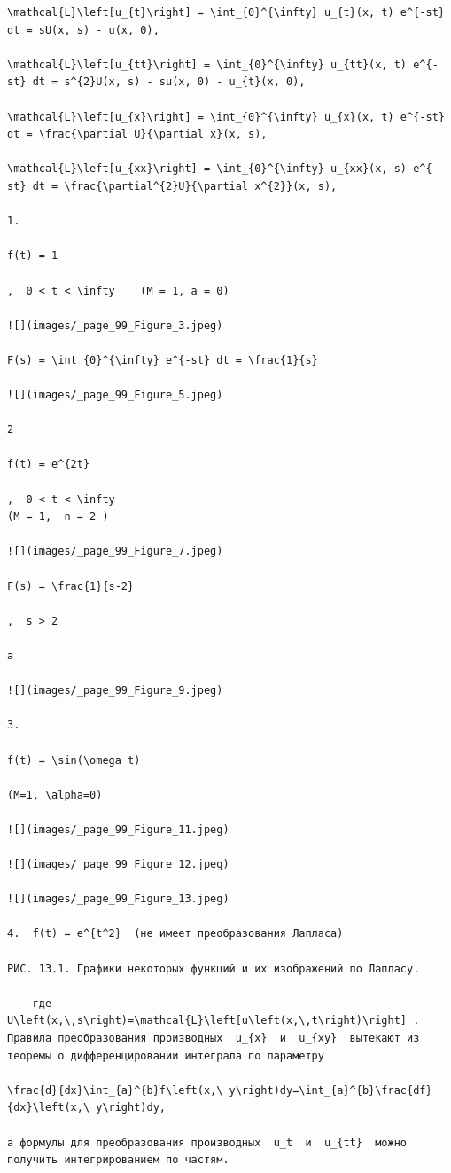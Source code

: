 \documentclass[
  ukrainian,
]{article}
\begin{document}
\begin{verbatim}
\mathcal{L}\left[u_{t}\right] = \int_{0}^{\infty} u_{t}(x, t) e^{-st} dt = sU(x, s) - u(x, 0),

\mathcal{L}\left[u_{tt}\right] = \int_{0}^{\infty} u_{tt}(x, t) e^{-st} dt = s^{2}U(x, s) - su(x, 0) - u_{t}(x, 0),

\mathcal{L}\left[u_{x}\right] = \int_{0}^{\infty} u_{x}(x, t) e^{-st} dt = \frac{\partial U}{\partial x}(x, s),

\mathcal{L}\left[u_{xx}\right] = \int_{0}^{\infty} u_{xx}(x, s) e^{-st} dt = \frac{\partial^{2}U}{\partial x^{2}}(x, s),

1.

f(t) = 1

,  0 < t < \infty    (M = 1, a = 0)

![](images/_page_99_Figure_3.jpeg)

F(s) = \int_{0}^{\infty} e^{-st} dt = \frac{1}{s}

![](images/_page_99_Figure_5.jpeg)

2

f(t) = e^{2t}

,  0 < t < \infty
(M = 1,  n = 2 )

![](images/_page_99_Figure_7.jpeg)

F(s) = \frac{1}{s-2}

,  s > 2

a

![](images/_page_99_Figure_9.jpeg)

3.

f(t) = \sin(\omega t)

(M=1, \alpha=0)

![](images/_page_99_Figure_11.jpeg)

![](images/_page_99_Figure_12.jpeg)

![](images/_page_99_Figure_13.jpeg)

4.  f(t) = e^{t^2}  (не имеет преобразования Лапласа)

РИС. 13.1. Графики некоторых функций и их изображений по Лапласу.

    где  U\left(x,\,s\right)=\mathcal{L}\left[u\left(x,\,t\right)\right] . Правила преобразования производных  u_{x}  и  u_{xy}  вытекают из теоремы о дифференцировании интеграла по параметру

\frac{d}{dx}\int_{a}^{b}f\left(x,\ y\right)dy=\int_{a}^{b}\frac{df}{dx}\left(x,\ y\right)dy,

а формулы для преобразования производных  u_t  и  u_{tt}  можно получить интегрированием по частям.


\end{verbatim}
\end{document}
